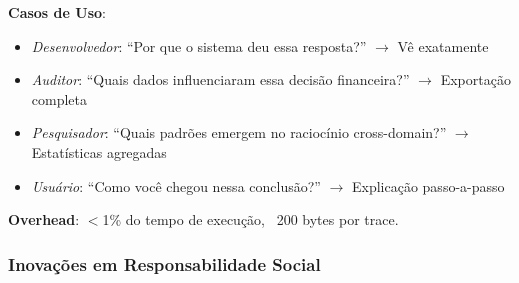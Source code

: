 \documentclass[11pt]{article}
\begin{document}
\textbf{Casos de Uso}:
\begin{itemize}
    \item \textit{Desenvolvedor}: ``Por que o sistema deu essa resposta?'' $\rightarrow$ Vê exatamente
    \item \textit{Auditor}: ``Quais dados influenciaram essa decisão financeira?'' $\rightarrow$ Exportação completa
    \item \textit{Pesquisador}: ``Quais padrões emergem no raciocínio cross-domain?'' $\rightarrow$ Estatísticas agregadas
    \item \textit{Usuário}: ``Como você chegou nessa conclusão?'' $\rightarrow$ Explicação passo-a-passo
\end{itemize}

\textbf{Overhead}: $<$1\% do tempo de execução, ~200 bytes por trace.

\subsubsection{Inovações em Responsabilidade Social}
\end{document}
